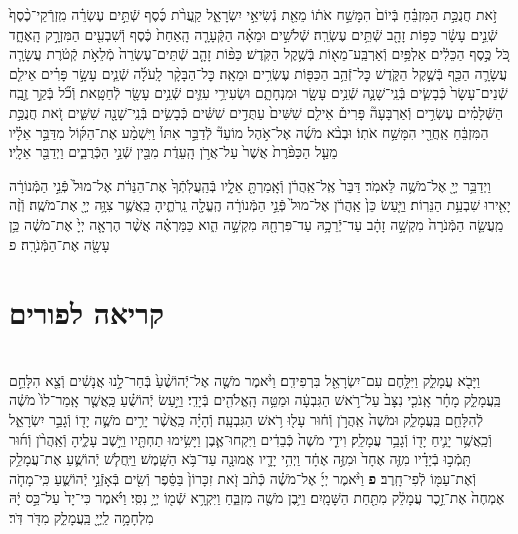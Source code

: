 \documentclass[twoside, openany, parskip=half, 11pt]{book}
\begin{document}
\begin{sometimes}
\begin{footnotesize}
\begin{multicols}{2}
זֹ֣את חֲנֻכַּ֣ת הַמִּזְבֵּ֗חַ בְּֿיוֹם֙ הִמָּשַׁ֣ח אֹת֔וֹ מֵאֵ֖ת נְֿשִׂיאֵ֣י יִשְׂרָאֵ֑ל קַֽעֲרֹ֨ת כֶּ֜סֶף שְֿׁתֵּ֣ים עֶשְׂרֵ֗ה מִֽזְרְֿקֵי־כֶ֨סֶף֙ שְֿׁנֵ֣ים עָשָׂ֔ר כַּפּ֥וֹת זָהָ֖ב שְֿׁתֵּ֥ים עֶשְׂרֵֽה׃ שְֿׁלֹשִׁ֣ים וּמֵאָ֗ה הַקְּֿעָרָ֤ה הָֽאַחַת֙ כֶּ֔סֶף וְֿשִׁבְעִ֖ים הַמִּזְרָ֣ק הָֽאֶחָ֑ד כֹּ֚ל כֶּ֣סֶף הַכֵּלִ֔ים אַלְפַּ֥יִם וְֿאַרְבַּֽע־מֵא֖וֹת בְּֿשֶׁ֥קֶל הַקֹּֽדֶשׁ׃ כַּפּ֨וֹת זָהָ֤ב שְֿׁתֵּים־עֶשְׂרֵה֙ מְֿלֵאֹ֣ת קְֿטֹ֔רֶת עֲשָׂרָ֧ה עֲשָׂרָ֛ה הַכַּ֖ף בְּֿשֶׁ֣קֶל הַקֹּ֑דֶשׁ כׇּל־זְֿהַ֥ב הַכַּפּ֖וֹת עֶשְׂרִ֥ים וּמֵאָֽה׃ כׇּל־הַבָּקָ֨ר לָֽעֹלָ֜ה שְֿׁנֵ֧ים עָשָׂ֣ר פָּרִ֗ים אֵילִ֤ם שְֿׁנֵים־עָשָׂר֙ כְּֿבָשִׂ֧ים בְּֿנֵֽי־שָׁנָ֛ה שְֿׁנֵ֥ים עָשָׂ֖ר וּמִנְחָתָ֑ם וּשְׂעִירֵ֥י עִזִּ֛ים שְֿׁנֵ֥ים עָשָׂ֖ר לְֿחַטָּֽאת׃ וְֿכֹ֞ל בְּֿקַ֣ר זֶ֣בַֽח הַשְּֿׁלָמִ֗ים עֶשְׂרִ֣ים וְֿאַרְבָּעָה֘ פָּרִים֒ אֵילִ֤ם שִׁשִּׁים֙ עַתֻּדִ֣ים שִׁשִּׁ֔ים כְּֿבָשִׂ֥ים בְּֿנֵֽי־שָׁנָ֖ה שִׁשִּׁ֑ים זֹ֚את חֲנֻכַּ֣ת הַמִּזְבֵּ֔חַ אַֽחֲרֵ֖י הִמָּשַׁ֥ח אֹתֽוֹ׃ וּבְבֹ֨א מֹשֶׁ֜ה אֶל־אֹ֣הֶל מוֹעֵד֘ לְֿדַבֵּ֣ר אִתּוֹ֒ וַיִּשְׁמַ֨ע אֶת־הַקּ֜וֹל מִדַּבֵּ֣ר אֵלָ֗יו מֵעַ֤ל הַכַּפֹּ֨רֶת֙ אֲשֶׁר֙ עַל־אֲרֹ֣ן הָֽעֵדֻ֔ת מִבֵּ֖ין שְֿׁנֵ֣י הַכְּֿרֻבִ֑ים וַיְדַבֵּ֖ר אֵלָֽיו׃

וַיְדַבֵּ֥ר יְיָ֖ אֶל־מֹשֶׁ֥ה לֵּאמֹֽר׃ דַּבֵּר֙ אֶֽל־אַֽהֲרֹ֔ן וְֿאָֽמַרְתָּ֖ אֵלָ֑יו בְּֿהַֽעֲלֹֽתְֿךָ֙ אֶת־הַנֵּרֹ֔ת אֶל־מוּל֙ פְּֿנֵ֣י הַמְּֿנוֹרָ֔ה יָאִ֖ירוּ שִׁבְעַ֥ת הַנֵּרֽוֹת׃ וַיַּ֤עַשׂ כֵּן֙ אַֽהֲרֹ֔ן אֶל־מוּל֙ פְּֿנֵ֣י הַמְּֿנוֹרָ֔ה הֶֽעֱלָ֖ה נֵֽרֹתֶ֑יהָ כַּֽאֲשֶׁ֛ר צִוָּ֥ה יְיָ֖ אֶת־מֹשֶֽׁה׃ וְֿזֶ֨ה מַֽעֲשֵׂ֤ה הַמְּֿנֹרָה֙ מִקְשָׁ֣ה זָהָ֔ב עַד־יְֿרֵכָ֥הּ עַד־פִּרְחָ֖הּ מִקְשָׁ֣ה הִ֑וא כַּמַּרְאֶ֗ה אֲשֶׁ֨ר הֶרְאָ֤ה יְיָ֙ אֶת־מֹשֶׁ֔ה כֵּ֥ן עָשָׂ֖ה אֶת־הַמְּֿנֹרָֽה׃ פ

\end{multicols}

\section[פורים]{קריאה לפורים}


\begin{multicols}{2}
\\
וַיָּבֹ֖א עֲמָלֵ֑ק וַיִּלָּ֥חֶם עִם־יִשְׂרָאֵ֖ל בִּרְפִידִֽם׃ וַיֹּ֨אמֶר מֹשֶׁ֤ה אֶל־יְֿהוֹשֻׁ֨עַ֙ בְּֿחַר־לָ֣נוּ אֲנָשִׁ֔ים וְֿצֵ֖א הִלָּחֵ֣ם בַּֽעֲמָלֵ֑ק מָחָ֗ר אָֽנֹכִ֤י נִצָּב֙ עַל־רֹ֣אשׁ הַגִּבְעָ֔ה וּמַטֵּ֥ה הָֽאֱלֹהִ֖ים בְּֿיָדִֽי׃ וַיַּ֣עַשׂ יְֿהוֹשֻׁ֗עַ כַּֽאֲשֶׁ֤ר אָֽמַר־לוֹ֙ מֹשֶׁ֔ה לְֿהִלָּחֵ֖ם בַּֽעֲמָלֵ֑ק וּמֹשֶׁה֙ אַֽהֲרֹ֣ן וְֿח֔וּר עָל֖וּ רֹ֥אשׁ הַגִּבְעָֽה׃ 
וְֿהָיָ֗ה כַּֽאֲשֶׁ֨ר יָרִ֥ים מֹשֶׁ֛ה יָד֖וֹ וְֿגָבַ֣ר יִשְׂרָאֵ֑ל וְֿכַֽאֲשֶׁ֥ר יָנִ֛יחַ יָד֖וֹ וְֿגָבַ֥ר עֲמָלֵֽק׃ וִידֵ֤י מֹשֶׁה֙ כְּֿבֵדִ֔ים וַיִּקְחוּ־אֶ֛בֶן וַיָּשִׂ֥ימוּ תַחְתָּ֖יו וַיֵּ֣שֶׁב עָלֶ֑יהָ וְֿאַֽהֲרֹ֨ן וְֿח֜וּר תָּֽמְֿכ֣וּ בְֿיָדָ֗יו מִזֶּ֤ה אֶחָד֙ וּמִזֶּ֣ה אֶחָ֔ד וַיְהִ֥י יָדָ֛יו אֱמוּנָ֖ה עַד־בֹּ֥א הַשָּֽׁמֶשׁ׃ וַיַּֽחֲל֧שׁ יְֿהוֹשֻׁ֛עַ אֶת־עֲמָלֵ֥ק וְֿאֶת־עַמּ֖וֹ לְֿפִי־חָֽרֶב׃ \textbf{פ}
וַיֹּ֨אמֶר יְיָ֜ אֶל־מֹשֶׁ֗ה כְּֿתֹ֨ב זֹ֤את זִכָּרוֹן֙ בַּסֵּ֔פֶר וְֿשִׂ֖ים בְּֿאָזְֿנֵ֣י יְֿהוֹשֻׁ֑עַ כִּֽי־מָחֹ֤ה אֶמְחֶה֙ אֶת־זֵ֣כֶר עֲמָלֵ֔ק מִתַּ֖חַת הַשָּׁמָֽיִם׃ וַיִּ֥בֶן מֹשֶׁ֖ה מִזְבֵּ֑חַ וַיִּקְרָ֥א שְֿׁמ֖וֹ יְיָ֥ נִסִּֽי׃ וַיֹּ֗אמֶר כִּי־יָד֙ עַל־כֵּ֣ס יָ֔הּ מִלְחָמָ֥ה לַֽיְיָ֖ בַּֽעֲמָלֵ֑ק מִדֹּ֖ר דֹּֽר׃


\end{multicols}
\end{footnotesize}
\end{sometimes}
\end{document}
